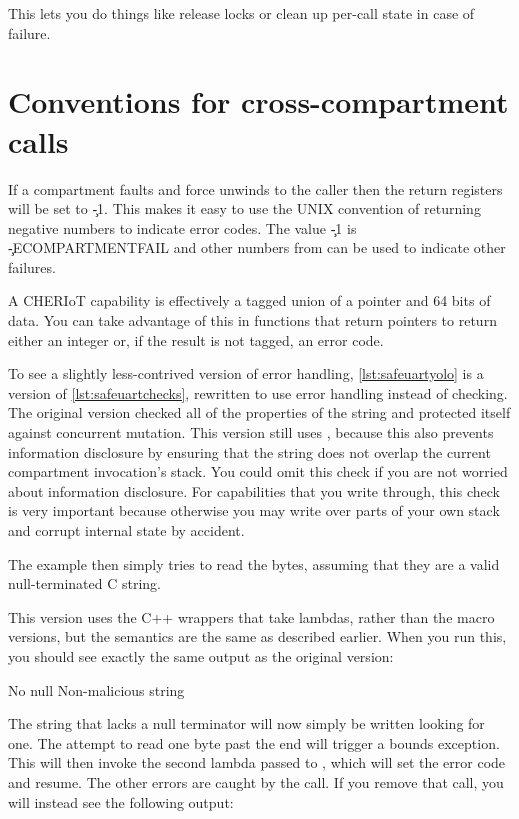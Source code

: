 This lets you do things like release locks or clean up per-call state in case of failure.

\section{Conventions for cross-compartment calls}

If a compartment faults and force unwinds to the caller then the return registers will be set to \c{-1}.
This makes it easy to use the UNIX convention of returning negative numbers to indicate error codes.
The value \c{-1} is \c{-ECOMPARTMENTFAIL} and other numbers from  can be used to indicate other failures.

A CHERIoT capability is effectively a tagged union of a pointer and 64 bits of data.
You can take advantage of this in functions that return pointers to return either an integer or, if the result is not tagged, an error code.

To see a slightly less-contrived version of error handling, \ref{lst:safeuartyolo} is a version of \ref{lst:safeuartchecks}, rewritten to use error handling instead of checking.
The original version checked all of the properties of the string and protected itself against concurrent mutation.
This version still uses , because this also prevents information disclosure by ensuring that the string does not overlap the current compartment invocation's stack.
You could omit this check if you are not worried about information disclosure.
For capabilities that you write through, this check is very important because otherwise you may write over parts of your own stack and corrupt internal state by accident.

The example then simply tries to read the bytes, assuming that they are a valid null-terminated C string.

\codelisting[marker=safe_uart,caption=Using structured error handling to ensure that a function does not crash.,label=lst:safeuartyolo, filename=examples/yolo_arguments/uart.cc]{}

This version uses the C++ wrappers that take lambdas, rather than the macro versions, but the semantics are the same as described earlier.
When you run this, you should see exactly the same output as the original version:

\begin{console}
No null
Non-malicious string
\end{console}

The string that lacks a null terminator will now simply be written looking for one.
The attempt to read one byte past the end will trigger a bounds exception.
This will then invoke the second lambda passed to , which will set the error code and resume.
The other errors are caught by the  call.
If you remove that call, you will instead see the following output:

